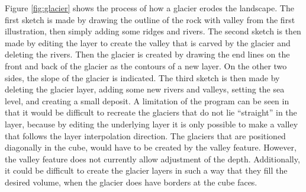 \documentclass[a4paper,12pt]{report}
\begin{document}
Figure \ref{fig:glacier} shows the process of how a glacier erodes the landscape. The first sketch is made by drawing the outline of the rock with valley from the first illustration, then simply adding some ridges and rivers. The second sketch is then made by editing the layer to create the valley that is carved by the glacier and deleting the rivers. Then the glacier is created by drawing the end lines on the front and back of the glacier as the contours of a new layer. On the other two sides, the slope of the glacier is indicated. The third sketch is then made by deleting the glacier layer, adding some new rivers and valleys, setting the sea level, and creating a small deposit. A limitation of the program can be seen in that it would be difficult to recreate the glaciers that do not lie ``straight'' in the layer, because by editing the underlying layer it is only possible to make a valley that follows the layer interpolation direction. The glaciers that are positioned diagonally in the cube, would have to 
be created by the valley feature. However, the valley feature does not currently allow adjustment of the depth. Additionally, it could be difficult to create the glacier layers in such a way that they fill the desired volume, when the glacier does have borders at the cube faces.
\end{document}
